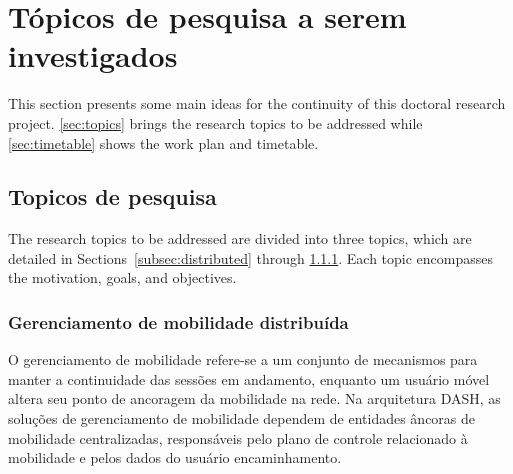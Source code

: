 \clearpage
\section{Tópicos de pesquisa a serem investigados}
\label{ch:proposal}

This section presents some main ideas for the continuity of this doctoral
research project. \autoref{sec:topics} brings the research topics to be
addressed while \autoref{sec:timetable} shows the work plan and timetable.

\subsection{Topicos de pesquisa}
\label{sec:topics}


The research topics to be addressed are divided into three topics, which are
detailed in Sections~\ref{subsec:distributed} through \ref{subsec:handover}.
Each topic encompasses the motivation, goals, and objectives.

\subsubsection{Gerenciamento de mobilidade distribuída}
\label{subsec:handover}

O gerenciamento de mobilidade refere-se a um conjunto de mecanismos para manter a continuidade das sessões em andamento, enquanto um usuário móvel altera seu ponto de ancoragem da mobilidade na rede.
Na arquitetura DASH, as soluções de gerenciamento de mobilidade dependem de entidades âncoras de mobilidade centralizadas, responsáveis pelo plano de controle relacionado à mobilidade e pelos dados do usuário encaminhamento. 

